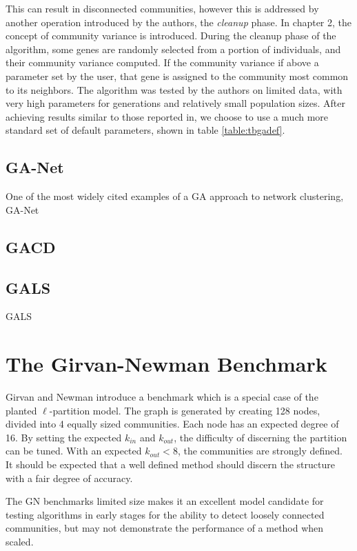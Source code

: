 This can result in disconnected communities, however this is addressed by another operation introduced by the authors, the \textit{cleanup} phase. In chapter 2, the concept of community variance is introduced. During the cleanup phase of the algorithm, some genes are randomly selected from a portion of individuals, and their community variance computed. If the community variance if above a parameter set by the user, that gene is assigned to the community most common to its neighbors.
The algorithm was tested by the authors on limited data, with very high parameters for generations and relatively small population sizes. After achieving results similar to those reported in\cite{Tasgin2006}, we choose to use a much more standard set of default parameters, shown in table \ref{table:tbgadef}.

\subsection{GA-Net}

One of the most widely cited examples of a GA approach to network clustering, GA-Net\cite{Pizzuti2008} 



\subsection{GACD}
\cite{Shi2009}



\subsection{GALS}
GALS\cite{liu2013genetic}


\section{The Girvan-Newman Benchmark}

Girvan and Newman introduce a benchmark which is a special case of the planted $\ell$-partition model\cite{Girvan2002}. The graph is generated by creating 128 nodes, divided into 4 equally sized communities. Each node has an expected degree of 16. By setting the expected $k_{in}$ and $k_{out}$, the difficulty of discerning the partition can be tuned. With an expected $k_{out} < 8$, the communities are strongly defined. It should be expected that a well defined method should discern the structure with a fair degree of accuracy. 

The GN benchmarks limited size makes it an excellent model candidate for testing algorithms in early stages for the ability to detect loosely connected communities, but may not demonstrate the performance of a method when scaled\cite{Yang2016}.


